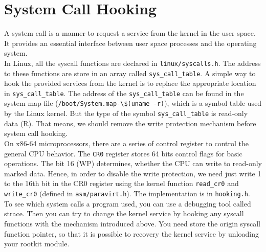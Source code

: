 \section{System Call Hooking}
\label{sec:syscallHooking}
A system call is a manner to request a service from the kernel in the user 
space. It provides an essential interface between user space processes and the 
operating system.\\
In Linux, all the syscall functions are declared in \verb+linux/syscalls.h+. The 
address to these functions are store in an array called \verb+sys_call_table+. 
A simple way to hook the provided services from the kernel is to replace the 
appropriate location in \verb+sys_call_table+. The address of the 
\verb+sys_call_table+ can be found in the system map file 
(\verb+/boot/System.map-\$(uname -r)+), which is a symbol table used by the 
Linux kernel. But the type of the symbol \verb+sys_call_table+ is read-only data 
(R). That means, we should remove the write protection mechanism before system 
call hooking.\\
On x86-64 microprocessors, there are a series of control register to control the 
general CPU behavior. The \texttt{CR0} register stores 64 bits control flags for 
basic operations. The bit 16 (WP) determines, whether the CPU can write to 
read-only marked data. Hence, in order to disable the write protection, we need 
just write 1 to the 16th bit in the CR0 register using the kernel function 
\verb+read_cr0+ and \verb+write_cr0+ (defined in \verb+asm/paravirt.h+). The 
implementation is in \texttt{hooking.h}.\\
To see which system calls a program used, you can use a debugging tool called 
strace. Then you can try to change the kernel service by hooking any syscall 
functions with the mechanism introduced above. You need store the origin syscall 
function pointer, so that it is possible to recovery the kernel service by 
unloading your rootkit module. 

